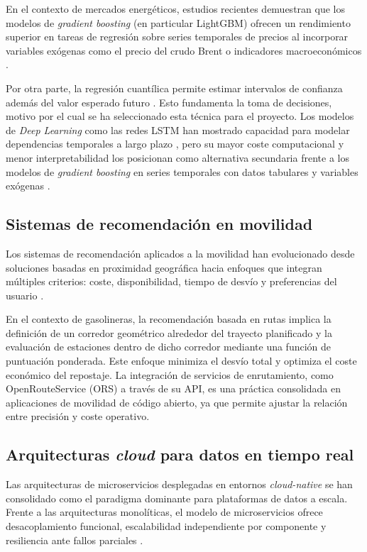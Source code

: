 En el contexto de mercados energéticos, estudios recientes demuestran que los modelos de
\textit{gradient boosting} (en particular LightGBM) ofrecen un rendimiento superior en
tareas de regresión sobre series temporales de precios al incorporar variables exógenas
como el precio del crudo Brent o indicadores macroeconómicos \cite{LAHMIRI2024105008}.

Por otra parte, la regresión cuantílica permite estimar intervalos de confianza además del valor esperado futuro \cite{s24124013}.
Esto fundamenta la toma de decisiones, motivo por el cual se ha seleccionado esta técnica para el proyecto.
Los modelos de \textit{Deep Learning} como las redes LSTM han mostrado capacidad para
modelar dependencias temporales a largo plazo \cite{8945584}, pero su mayor coste
computacional y menor interpretabilidad los posicionan como alternativa secundaria frente
a los modelos de \textit{gradient boosting} en series temporales con datos tabulares y
variables exógenas \cite{LAHMIRI2024105008}.

\subsection{Sistemas de recomendación en movilidad}

Los sistemas de recomendación aplicados a la movilidad han evolucionado desde soluciones
basadas en proximidad geográfica hacia enfoques que integran múltiples criterios: coste,
disponibilidad, tiempo de desvío y preferencias del usuario \cite{mitma_esmovilidad}.

En el contexto de gasolineras, la recomendación basada en rutas implica la definición de
un corredor geométrico alrededor del trayecto planificado y la evaluación de estaciones
dentro de dicho corredor mediante una función de puntuación ponderada. Este enfoque minimiza el desvío total y optimiza el coste económico del repostaje. 
La integración de servicios de enrutamiento, como OpenRouteService
(ORS) \cite{osm_wiki_routers}a través de su API, es una práctica consolidada en aplicaciones de movilidad de código
abierto, ya que permite ajustar la relación entre precisión y coste operativo.

\subsection{Arquitecturas \textit{cloud} para datos en tiempo real}

Las arquitecturas de microservicios desplegadas en entornos \textit{cloud-native} se han
consolidado como el paradigma dominante para plataformas de datos a escala. Frente a las
arquitecturas monolíticas, el modelo de microservicios ofrece desacoplamiento funcional,
escalabilidad independiente por componente y resiliencia ante fallos parciales
\cite{Gartner2026Trends}.


